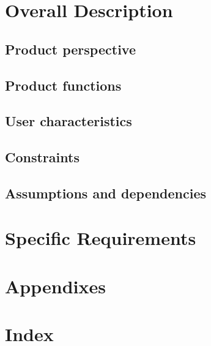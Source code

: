 \documentclass[10pt,letterpaper,onecolumn,draftclsnofoot]{IEEEtran}
\begin{document}
\section{Overall Description}
\subsection{Product perspective}
\subsection{Product functions}
\subsection{User characteristics}
\subsection{Constraints}
\subsection{Assumptions and dependencies}
\section{Specific Requirements}
\clearpage
\section{Appendixes}
\section{Index}
\end{document}
